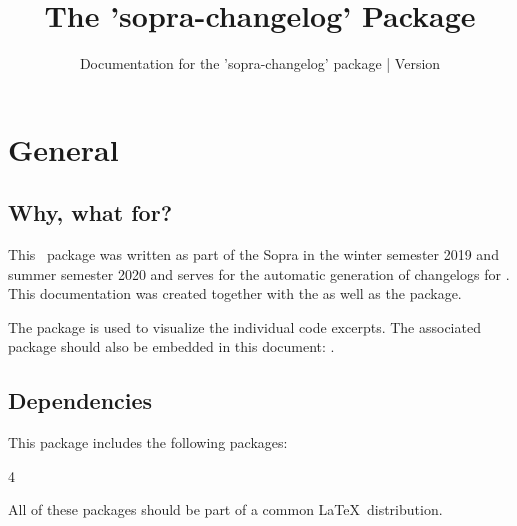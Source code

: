 \documentclass{sopra-base}
\title{The 'sopra-changelog' Package}
\subtitle[Documentation for the 'sopra-changelog' package]{Documentation for the 'sopra-changelog' package | Version \thesocversion}
\begin{document}
    \maketitle
%
%
%
%

\section{General}
\subsection{Why, what for?}
    This \LaTeXe\ package was written as part of the Sopra in the
    winter semester 2019 and summer semester 2020 and serves for the automatic generation of changelogs for . This documentation was created together with the
     as well as the  package.\par
    The  package is used to visualize the individual code
    excerpts.
    The associated package should also be embedded in this document: . 
\subsection{Dependencies}
    This package includes the following packages:
    \begin{multicols}{4}
    \end{multicols}
    All of these packages should be part of a common \LaTeX\ distribution.
\end{document}
